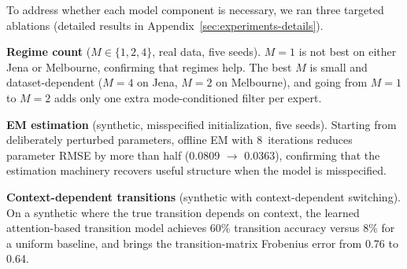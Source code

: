 To address whether each model component is necessary, we ran three targeted ablations
(detailed results in Appendix~\ref{sec:experiments-details}).

\textbf{Regime count} (\(M\in\{1,2,4\}\), real data, five seeds).
\(M=1\) is not best on either Jena or Melbourne, confirming that regimes help. The best \(M\) is
small and dataset-dependent (\(M=4\) on Jena, \(M=2\) on Melbourne), and going from \(M=1\) to
\(M=2\) adds only one extra mode-conditioned filter per expert.

\textbf{EM estimation} (synthetic, misspecified initialization, five seeds).
Starting from deliberately perturbed parameters, offline EM with 8~iterations reduces parameter RMSE
by more than half (0.0809 \(\to\) 0.0363), confirming that the estimation machinery recovers useful
structure when the model is misspecified.

\textbf{Context-dependent transitions} (synthetic with context-dependent switching).
On a synthetic where the true transition depends on context, the learned attention-based transition
model achieves 60\% transition accuracy versus 8\% for a uniform baseline, and brings the
transition-matrix Frobenius error from 0.76 to 0.64.

